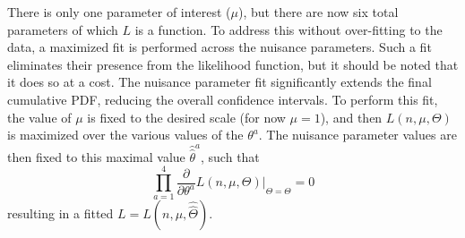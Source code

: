     There is only one parameter of interest ($\mu$), but there are now six total parameters of which $L$ is a function.
    To address this without over-fitting to the data, a maximized fit is performed across the nuisance parameters.
    Such a fit eliminates their presence from the likelihood function, but it should be noted that it does so at a cost.
    The nuisance parameter fit significantly extends the final cumulative PDF, reducing the overall confidence intervals.
    To perform this fit, the value of $\mu$ is fixed to the desired scale (for now $\mu=1$),
        and then $L(n,\mu,\Theta)$ is maximized over the various values of the $\theta^a$.
    The nuisance parameter values are then fixed to this maximal value $\hat{\hat\theta}^a$, such that
    \begin{equation}
        \prod \limits_{a=1}^{4} \frac{\partial}{\partial \theta^a} L(n,\mu,\Theta) |_{\Theta=\hat{\hat\Theta}} = 0
    \end{equation}
    resulting in a fitted $L = L(n,\mu,\hat{\hat\Theta})$.
        
